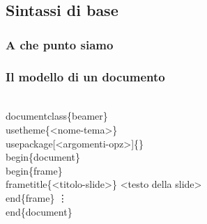 \documentclass[svgnames,%
	ucs,%
	pdftex]{guitbeamer}
\begin{document}
\subsection{Sintassi di base}
\begin{frame}
  \frametitle{A che punto siamo}
\end{frame}
\begin{frame}
  \frametitle{Il modello di un documento}
	\begin{LaTeXcode}
		\\documentclass\{\alert{beamer}\}\n
	  \onslide<2->
		\\usetheme\{\alert{<nome-tema>}\}\n
	  \onslide<3>
		\\usepackage[<argomenti-opz>]\{<nome-package>\}\n
	  \onslide<4->
	  \smallskip
		\\begin\{document\}\n
	  \onslide<5->
		\hspace*{5ex}\\begin\{\alert{frame}\}\n
	  \onslide<6->
		\hspace*{10ex}\\frametitle\{\alert{<titolo-slide>}\}\n
		\hspace*{15ex}\alert{<testo della slide>}\n
	  \onslide<5->
		\hspace*{5ex}\\end\{\alert{frame}\}\n
	  \onslide<7->
		\hspace*{10ex}\vdots\n
	  \onslide<4->
		\smallskip
		\\end\{document\}
	\end{LaTeXcode}
\end{frame}
\end{document}
